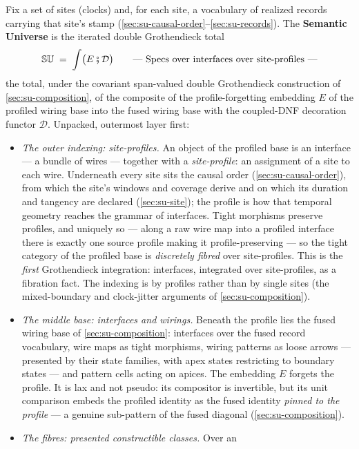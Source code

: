 \begin{definition}
\label{def:su-semantic-universe}
Fix a set of sites (clocks) and, for each site, a vocabulary of
realized records carrying that site's stamp
(\autoref{sec:su-causal-order}--\autoref{sec:su-records}). The
\textbf{Semantic Universe} is the iterated double Grothendieck
total
\[
  \mathbb{SU}
  \;=\;
  \int \bigl( E \fatsemi \mathcal{D} \bigr)
  \qquad
  \text{---\ Specs over interfaces over site-profiles ---}
\]
the total, under the covariant span-valued double Grothendieck
construction of \autoref{sec:su-composition}, of the composite
of the profile-forgetting embedding $E$ of the profiled wiring base
into the fused wiring base with the coupled-DNF decoration functor
$\mathcal{D}$. Unpacked, outermost layer first:
\begin{itemize}
\item \emph{The outer indexing: site-profiles.} An object of the
profiled base is an interface --- a bundle of wires --- together
with a \emph{site-profile}: an assignment of a site to each wire.
Underneath every site sits the causal order
(\autoref{sec:su-causal-order}), from which the site's windows and
coverage derive and on which its duration and tangency are declared
(\autoref{sec:su-site}); the profile is how that temporal
geometry reaches the grammar of interfaces. Tight morphisms
preserve profiles, and uniquely so --- along a raw wire map into a
profiled interface there is exactly one source profile making it
profile-preserving --- so the tight category of the profiled base
is \emph{discretely fibred} over site-profiles. This is the
\emph{first} Grothendieck integration: interfaces, integrated over
site-profiles, as a fibration fact. The indexing is by profiles
rather than by single sites (the mixed-boundary and clock-jitter
arguments of \autoref{sec:su-composition}).
\item \emph{The middle base: interfaces and wirings.} Beneath the
profile lies the fused wiring base of
\autoref{sec:su-composition}: interfaces over the fused record
vocabulary, wire maps as tight morphisms, wiring patterns as loose
arrows --- presented by their state families, with apex states
restricting to boundary states --- and pattern cells acting on
apices. The embedding $E$ forgets the profile. It is lax and not
pseudo: its compositor is invertible, but its unit
comparison embeds the profiled identity as the fused identity
\emph{pinned to the profile} --- a genuine sub-pattern of the fused
diagonal (\autoref{sec:su-composition}).
\item \emph{The fibres: presented constructible classes.} Over an

\end{itemize}
\end{definition}
